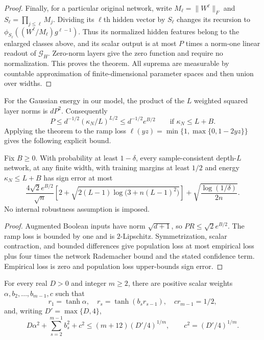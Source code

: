 \begin{proof}
Finally, for a particular original network, write
$M_\ell=\|W^\ell\|_F$ and $S_\ell=\prod_{j\le\ell}M_j$.
Dividing its $\ell$th hidden vector by $S_\ell$ changes its recursion to
$\phi_{S_\ell}((W^\ell/M_\ell)g^{\ell-1})$.
Thus its normalized hidden features belong to the enlarged classes above,
and its scalar output is at most $P$ times a norm-one linear readout of
$\mathcal G_H$. Zero-norm layers give the zero function and require no
normalization. This proves the theorem. All suprema are measurable by
countable approximation of finite-dimensional parameter spaces and then
union over widths.
\end{proof}

For the Gaussian energy in our model, the product of the $L$ weighted
squared layer norms is $dP^2$. Consequently
\[
 P\le d^{-1/2}(\kappa_N/L)^{L/2}
 \le d^{-1/2}e^{B/2}\qquad\text{if }\kappa_N\le L+B.
\]
Applying the theorem to the ramp loss
$\ell(yz)=\min\{1,\max\{0,1-2yz\}\}$ gives the following explicit bound.

\begin{corollary}\label{cor:excess-risk}
Fix $B\ge0$. With probability at least $1-\delta$, every sample-consistent
depth-$L$ network, at any finite width, with training margins at least $1/2$
and energy $\kappa_N\le L+B$ has sign error at most
\[
 \frac{4\sqrt2 e^{B/2}}{\sqrt n}
 \left[2+\sqrt{2(L-1)\log\bigl(3+n(L-1)^2\bigr)}\right]
 +\sqrt{\frac{\log(1/\delta)}{2n}}.
\]
No internal robustness assumption is imposed.
\end{corollary}

\begin{proof}
Augmented Boolean inputs have norm $\sqrt{d+1}$, so $PR\le\sqrt2e^{B/2}$.
The ramp loss is bounded by one and is $2$-Lipschitz. Symmetrization,
scalar contraction, and bounded differences give population loss at most
empirical loss plus four times the network Rademacher bound and the
stated confidence term. Empirical loss is zero and population loss
upper-bounds sign error.
\end{proof}

\begin{lemma}\label{lem:scalar-transmission}
For every real $D>0$ and integer $m\ge2$, there are positive scalar weights
$\alpha,b_2,\ldots,b_{m-1},c$ such that
\[
 r_1=\tanh\alpha,\quad r_s=\tanh(b_s r_{s-1}),\quad
 cr_{m-1}=1/2,
\]
and, writing $D'=\max\{D,4\}$,
\[
 D\alpha^2+\sum_{s=2}^{m-1}b_s^2+c^2
 \le(m+12)(D'/4)^{1/m},\qquad c^2=(D'/4)^{1/m}.
\]
\end{lemma}

